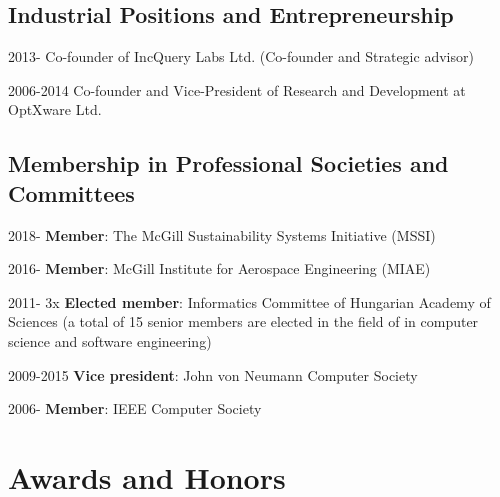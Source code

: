 \subsection{Industrial Positions and Entrepreneurship} 
\begin{yearlist}
\item[2013-] Co-founder of IncQuery Labs Ltd. (Co-founder and Strategic advisor) 
\item[2006-2014] Co-founder and Vice-President of Research and Development at OptXware Ltd. 
\end{yearlist}

\subsection{Membership in Professional Societies and Committees}
\begin{yearlist}
\item[2018-] \textbf{Member}: The McGill Sustainability Systems Initiative (MSSI)
\item[2016-] \textbf{Member}: McGill Institute for Aerospace Engineering (MIAE)
\item[2011-] 3x \textbf{Elected member}: Informatics Committee of Hungarian Academy of Sciences (a total of 15 senior members are elected in the field of in computer science and software engineering)
\item[2009-2015] \textbf{Vice president}: John von Neumann Computer Society 
\item[2006-] \textbf{Member}: IEEE Computer Society 
\end{yearlist}


\section{Awards and Honors} 

